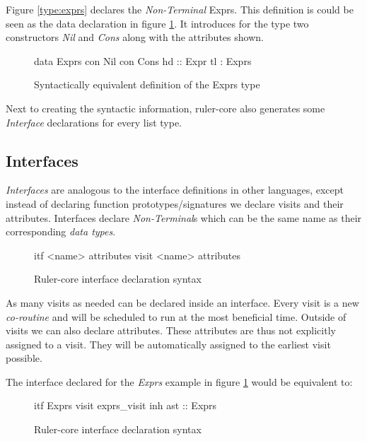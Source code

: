 Figure \ref{type:exprs} declares the \emph{Non-Terminal} Exprs. This definition is could be seen as the data declaration in figure \ref{type:lists}. It introduces for the type two constructors \emph{Nil} and \emph{Cons} along with the attributes shown.

\begin{figure}[h!]
\begin{code}
data Exprs
  con Nil
  con Cons
    hd :: Expr
    tl :  Exprs
\end{code}
\caption{Syntactically equivalent definition of the Exprs type}
\label{type:lists}
\end{figure}

Next to creating the syntactic information, ruler-core also generates some \emph{Interface} declarations for every list type. 

\subsection{Interfaces}
\emph{Interfaces} are analogous to the interface definitions in other languages, except instead of declaring function prototypes/signatures we declare visits and their attributes. Interfaces declare \emph{Non-Terminal}s which can be the same name as their corresponding \emph{data types}.

\begin{figure}[h!]
\begin{code}
itf <name>
  {attributes}
  {visit <name>
    {attributes}
  }
\end{code}
\caption{Ruler-core interface declaration syntax}
\label{itf:syntax}
\end{figure}

As many visits as needed can be declared inside an interface. Every visit is a new \emph{co-routine} and will be scheduled to run at the most beneficial time. Outside of visits we can also declare attributes. These attributes are thus not explicitly assigned to a visit. They will be automatically assigned to the earliest visit possible.

The interface declared for the \emph{Exprs} example in figure \ref{type:lists} would be equivalent to:

\begin{figure}[h!]
\begin{code}
itf Exprs
  visit exprs_visit
    inh ast :: Exprs
\end{code}
\caption{Ruler-core interface declaration syntax}
\label{itf:exprs}
\end{figure}

